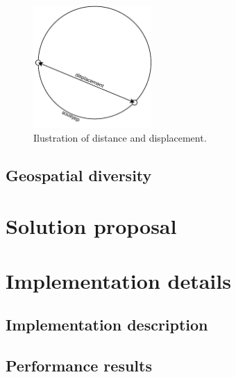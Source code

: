 \documentclass{ctuthesis}
\begin{document}
\begin{figure}
\includegraphics[width=0.4\textwidth]{displacement}
\caption{Ilustration of distance and displacement.}
\end{figure}

\section{Geospatial diversity}

\chapter{Solution proposal}


\chapter{Implementation details}

\section{Implementation description}

\section{Performance results}
\end{document}
